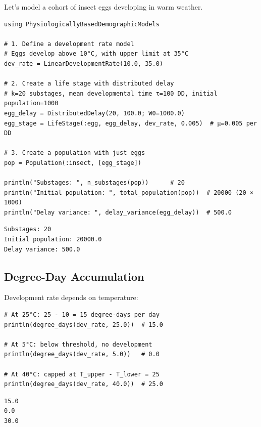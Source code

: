 \label{12259508673146386231}{}


Let’s model a cohort of insect eggs developing in warm weather.




\begin{verbatim}
using PhysiologicallyBasedDemographicModels

# 1. Define a development rate model
# Eggs develop above 10°C, with upper limit at 35°C
dev_rate = LinearDevelopmentRate(10.0, 35.0)

# 2. Create a life stage with distributed delay
# k=20 substages, mean developmental time τ=100 DD, initial population=1000
egg_delay = DistributedDelay(20, 100.0; W0=1000.0)
egg_stage = LifeStage(:egg, egg_delay, dev_rate, 0.005)  # μ=0.005 per DD

# 3. Create a population with just eggs
pop = Population(:insect, [egg_stage])

println("Substages: ", n_substages(pop))      # 20
println("Initial population: ", total_population(pop))  # 20000 (20 × 1000)
println("Delay variance: ", delay_variance(egg_delay))  # 500.0
\end{verbatim}




\begin{verbatim}
Substages: 20
Initial population: 20000.0
Delay variance: 500.0
\end{verbatim}



\subsection{Degree-Day Accumulation}



\label{7432690351982401920}{}


Development rate depends on temperature:




\begin{verbatim}
# At 25°C: 25 - 10 = 15 degree-days per day
println(degree_days(dev_rate, 25.0))  # 15.0

# At 5°C: below threshold, no development
println(degree_days(dev_rate, 5.0))   # 0.0

# At 40°C: capped at T_upper - T_lower = 25
println(degree_days(dev_rate, 40.0))  # 25.0
\end{verbatim}




\begin{verbatim}
15.0
0.0
30.0
\end{verbatim}



